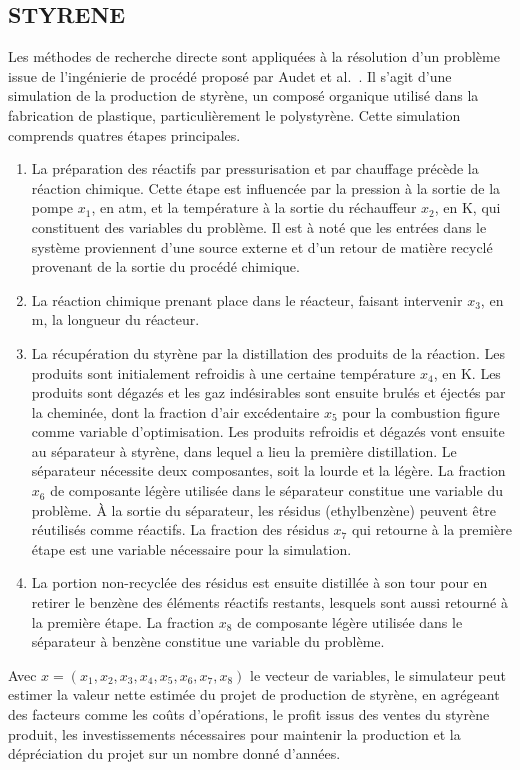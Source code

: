 \subsection{STYRENE}\label{sec:sty}
Les méthodes de recherche directe sont appliquées à la résolution d'un problème issue de l'ingénierie de procédé proposé par Audet et al.~\cite{AuBeLe08}. Il s'agit d'une simulation de la production de styrène, un composé organique utilisé dans la fabrication de plastique, particulièrement le polystyrène. Cette simulation comprends quatres étapes principales.
\begin{enumerate}[label=\roman*.]
\item La préparation des réactifs par pressurisation et par chauffage précède la réaction chimique. Cette étape est influencée par la pression à la sortie de la pompe $x_1$, en atm, et la température à la sortie du réchauffeur $x_2$, en K, qui constituent des variables du problème. Il est à noté que les entrées dans le système proviennent d'une source externe et d'un retour de matière recyclé provenant de la sortie du procédé chimique. 
\item La réaction chimique prenant place dans le réacteur, faisant intervenir $x_3$, en m, la longueur du réacteur.
\item La récupération du styrène par la distillation des produits de la réaction. Les produits sont initialement refroidis à une certaine température $x_4$, en K. Les produits sont dégazés et les gaz indésirables sont ensuite brulés et éjectés par la cheminée, dont la fraction d'air excédentaire $x_5$  pour la combustion figure comme variable d'optimisation. Les produits refroidis et dégazés vont ensuite au séparateur à styrène, dans lequel a lieu la première distillation. Le séparateur nécessite deux composantes, soit la lourde et la légère. La fraction $x_6$ de composante légère utilisée dans le séparateur constitue une variable du problème. À la sortie du séparateur, les résidus (ethylbenzène) peuvent être réutilisés comme réactifs. La fraction des résidus $x_7$ qui retourne à la première étape est une variable nécessaire pour la simulation.
\item La portion non-recyclée des résidus est ensuite distillée à son tour pour en retirer le benzène des éléments réactifs restants, lesquels sont aussi retourné à la première étape. La fraction $x_8$ de composante légère utilisée dans le séparateur à benzène constitue une variable du problème.
\end{enumerate}
Avec $x = (x_1,x_2,x_3,x_4,x_5,x_6,x_7,x_8)$ le vecteur de variables, le simulateur peut estimer la valeur nette estimée du projet de production de styrène, en agrégeant des facteurs comme les coûts d'opérations, le profit issus des ventes du styrène produit, les investissements nécessaires pour maintenir la production et la dépréciation du projet sur un nombre donné d'années.  

